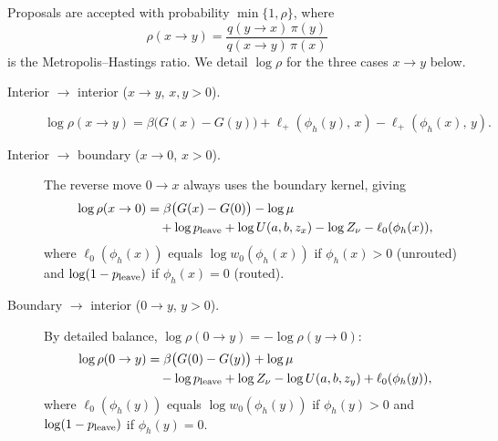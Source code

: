 \documentclass[aap,preprint]{imsart}
\numberwithin{equation}{section}
\theoremstyle{plain}
\theoremstyle{definition}
\begin{document}
Proposals are accepted with probability
$\min\{1,\rho\}$, where
\[
  \rho (x\to y)= \frac{q(y\to x)\,\pi(y)}{q(x\to y)\,\pi(x)}
\]
is the Metropolis--Hastings ratio. We detail $\log \rho$ for the three cases $x\to y$ below.
\begin{description}
  \item[Interior $\to$ interior ($x\to y$, $x,y>0$).]
  \begin{equation}\label{eq:logrho-int}
    \log\rho(x\to y)
    = \beta\bigl(G(x)-G(y)\bigr)
    + \ell_+(\phi_h(y),\,x) - \ell_+(\phi_h(x),\,y).
  \end{equation}

  \item[Interior $\to$ boundary ($x\to 0$, $x>0$).]
  The reverse move $0\to x$ always uses the boundary kernel, giving
  \begin{gather}
    \label{eq:logrho-bdy}
    \begin{split}
      \log\rho(x\to 0)
    &= \beta\bigl(G(x)-G(0)\bigr) - \log\mu\\
&\quad    + \log p_{\rm leave} + \log U(a,b,z_x)
    - \log Z_\nu - \ell_0(\phi_h(x)),
  \end{split}
  \end{gather}
  where $\ell_0(\phi_h(x))$ equals $\log w_0(\phi_h(x))$ if $\phi_h(x) > 0$ (unrouted)
  and $\log(1-p_{\rm leave})$ if $\phi_h(x) = 0$ (routed).

  \item[Boundary $\to$ interior ($0\to y$, $y>0$).]
  By detailed balance, $\log\rho(0\to y) = -\log\rho(y\to 0)$:
  \begin{gather}\label{eq:logrho-from0}
   \begin{split} \log\rho(0\to y)
    &= \beta\bigl(G(0)-G(y)\bigr) + \log\mu\\
&\quad    - \log p_{\rm leave} + \log Z_\nu
    - \log U(a,b,z_y) + \ell_0(\phi_h(y)),
  \end{split}\end{gather}
  where $\ell_0(\phi_h(y))$ equals $\log w_0(\phi_h(y))$ if $\phi_h(y) > 0$ and
  $\log(1-p_{\rm leave})$ if $\phi_h(y) = 0$.
\end{description}
\end{document}
